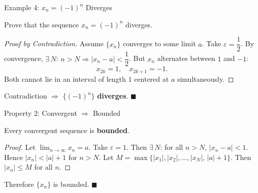 \documentclass[aspectratio=169,10pt]{beamer}
\begin{document}
\begin{frame}{Example 4: $x_n=(-1)^n$ Diverges}
  \begin{example}
    Prove that the sequence $x_n = (-1)^n$ diverges.
  \end{example}
  \pause
  \begin{proof}[Proof by Contradiction]
    Assume $\{x_n\}$ converges to some limit $a$.
    \pause
    Take $\varepsilon = \dfrac{1}{2}$.
    By convergence, $\exists\,N$: $n>N \Rightarrow |x_n - a| < \dfrac{1}{2}$.
    \pause
    But $x_n$ alternates between $1$ and $-1$:
    \[
      x_{2k}=1,\quad x_{2k+1}=-1.
    \]
    Both cannot lie in an interval of length $1$ centered at $a$ simultaneously.
  \end{proof}
  \pause
  \begin{center}
    Contradiction $\Rightarrow$ $\{(-1)^n\}$ \textbf{diverges}. \hfill$\blacksquare$
  \end{center}
\end{frame}

\begin{frame}{Property 2: Convergent $\Rightarrow$ Bounded}
  \theoremstyle{definition}
  \begin{theorem}[Boundedness]
    Every convergent sequence is \textbf{bounded}.
  \end{theorem}
  \pause
  \begin{proof}
    Let $\displaystyle\lim_{n\to\infty}x_n = a$. Take $\varepsilon = 1$.
    \pause
    Then $\exists\,N$: for all $n > N$, $|x_n - a| < 1$.
    \pause
    Hence $|x_n| < |a| + 1$ for $n > N$.
    \pause
    Let $M = \max\{|x_1|,|x_2|,\ldots,|x_N|,\,|a|+1\}$.
    Then $|x_n| \leq M$ for all $n$.
  \end{proof}
  \pause
  \begin{center}
    Therefore $\{x_n\}$ is bounded. \hfill$\blacksquare$
  \end{center}
\end{frame}
\end{document}
